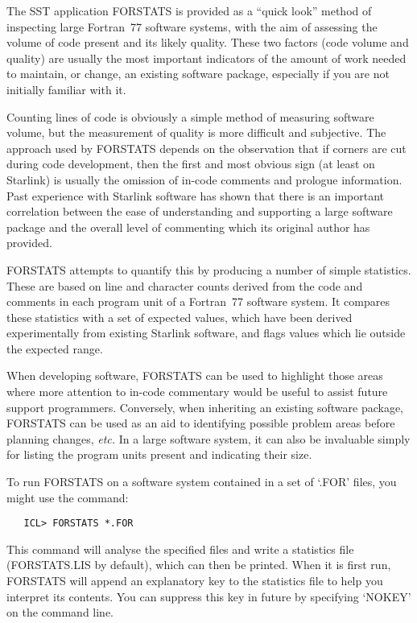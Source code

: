 \documentclass[twoside,11pt]{article}
\renewcommand{\_}{\texttt{\symbol{95}}}
\begin{document}
The SST application FORSTATS is provided as a ``quick look'' method of
inspecting large Fortran~77 software systems, with the aim of assessing the
volume of code present and its likely quality.
These two factors (code volume and quality) are usually the most important
indicators of the amount of work needed to maintain, or change, an existing
software package, especially if you are not initially familiar with it.

Counting lines of code is obviously a simple method of measuring software
volume, but the measurement of quality is more difficult and subjective.
The approach used by FORSTATS depends on the observation that if corners are
cut during code development, then the first and most obvious sign (at least
on Starlink) is usually the omission of in-code comments and prologue
information.
Past experience with Starlink software has shown that there is an important
correlation between the ease of understanding and supporting a large
software package and the overall level of commenting which its original
author has provided.

FORSTATS attempts to quantify this by producing a number of simple
statistics.
These are based on line and character counts derived from the code and
comments in each program unit of a Fortran~77 software system.
It compares these statistics with a set of expected values, which have been
derived experimentally from existing Starlink software, and flags values
which lie outside the expected range.

When developing software, FORSTATS can be used to highlight those areas
where more attention to in-code commentary would be useful to assist future
support programmers.
Conversely, when inheriting an existing software package, FORSTATS can be
used as an aid to identifying possible problem areas before planning
changes, {\em etc.}
In a large software system, it can also be invaluable simply for listing the
program units present and indicating their size.

To run FORSTATS on a software system contained in a set of `.FOR' files, you
might use the command:

\begin{verbatim}
   ICL> FORSTATS *.FOR
\end{verbatim}

This command will analyse the specified files and write a statistics file
(FORSTATS.LIS by default), which can then be printed.
When it is first run, FORSTATS will append an explanatory key to the
statistics file to help you interpret its contents.
You can suppress this key in future by specifying `NOKEY' on the command
line.
\end{document}
